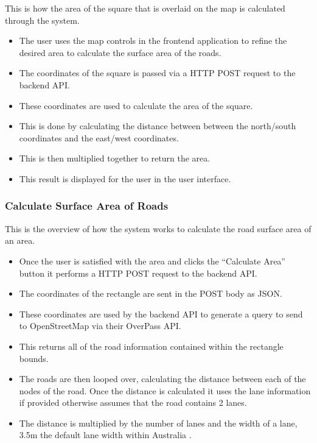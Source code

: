 \documentclass[a4paper,11pt]{article}
\begin{document}
This is how the area of the square that is overlaid on the map is calculated
through the system.

\begin{itemize}
  \item The user uses the map controls in the frontend application to refine
    the desired area to calculate the surface area of the roads.
  \item The coordinates of the square is passed via a HTTP POST request to
    the backend API.\@
  \item These coordinates are used to calculate the area of the square.
  \item This is done by calculating the distance between between the
    north/south coordinates and the east/west coordinates.
  \item This is then multiplied together to return the area.
  \item This result is displayed for the user in the user interface.
\end{itemize}

\subsubsection{Calculate Surface Area of Roads}

This is the overview of how the system works to calculate the road surface area
of an area.

\begin{itemize}
  \item Once the user is satisfied with the area and clicks the ``Calculate
    Area'' button it performs a HTTP POST request to the backend API.\@
  \item The coordinates of the rectangle are sent in the POST body as JSON.\@
  \item These coordinates are used by the backend API to generate a query to
    send to OpenStreetMap via their OverPass API.\@
  \item This returns all of the road information contained within the rectangle
    bounds.
  \item The roads are then looped over, calculating the distance between each of
    the nodes of the road. Once the distance is calculated it uses the lane
    information if provided otherwise assumes that the road contains 2 lanes.
  \item The distance is multiplied by the number of lanes and the width of a
    lane, 3.5m the default lane width within Australia \autocite{lane:11}.
\end{itemize}
\end{document}
